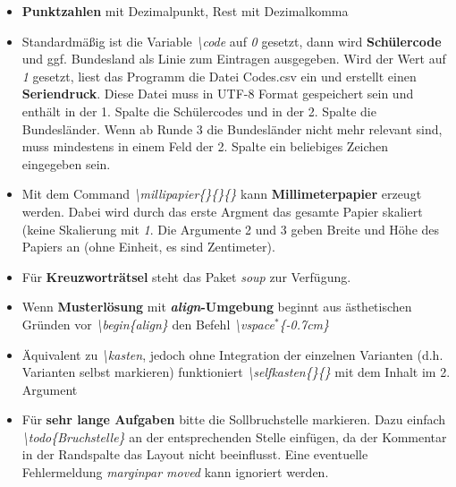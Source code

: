 \documentclass[../main.tex]{subfiles}
\begin{document}
\begin{itemize}
    \item \textbf{Punktzahlen} mit Dezimalpunkt, Rest mit Dezimalkomma
    \item Standardm\"a\ss{}ig ist die Variable \hypertarget{code}{\textit{\textbackslash code}} auf \textit{0} gesetzt, dann wird \textbf{Sch\"ulercode} und ggf. Bundesland als Linie zum Eintragen ausgegeben. Wird der Wert auf \textit{1} gesetzt, liest das Programm die Datei Codes.csv ein und erstellt einen \textbf{Seriendruck}. Diese Datei muss in UTF-8 Format gespeichert sein und enth\"alt in der 1. Spalte die Sch\"ulercodes und in der 2. Spalte die Bundesl\"ander. Wenn ab Runde 3 die Bundesl\"ander nicht mehr relevant sind, muss mindestens in einem Feld der 2. Spalte ein beliebiges Zeichen eingegeben sein.
    \item \hypertarget{millipapier}{} Mit dem Command \textit{\textbackslash millipapier\{\}\{\}\{\}} kann \textbf{Millimeterpapier} erzeugt werden. Dabei wird durch das erste Argment das gesamte Papier skaliert (keine Skalierung mit \textit{1}. Die Argumente 2 und 3 geben Breite und H\"ohe des Papiers an (ohne Einheit, es sind Zentimeter).
    \item F\"ur \textbf{Kreuzwortr\"atsel} steht das Paket \textit{soup} zur Verf\"ugung.
    \item \hypertarget{vspace}{} Wenn \textbf{Musterl\"osung} mit \textbf{\textit{align}-Umgebung} beginnt aus \"asthetischen Gr\"unden vor \textit{\textbackslash begin\{align\}} den Befehl \textit{\textbackslash vspace$^*$\{-0.7cm\}}
    \item \"Aquivalent zu \textit{\textbackslash kasten}, jedoch ohne Integration der einzelnen Varianten (d.h. Varianten selbst markieren) funktioniert \textit{\hypertarget{selfkasten}{\textbackslash selfkasten\{\}\{\}}} mit dem Inhalt im 2. Argument
    \item Für \textbf{sehr lange Aufgaben} bitte die Sollbruchstelle markieren. Dazu einfach \textit{\textbackslash{}todo\{Bruchstelle\}} an der entsprechenden Stelle einf\"ugen, da der Kommentar in der Randspalte das Layout nicht beeinflusst. Eine eventuelle Fehlermeldung \textit{marginpar moved} kann ignoriert werden.
\end{itemize}
\end{document}
